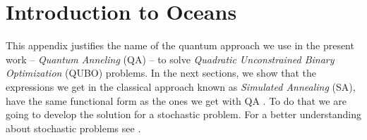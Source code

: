 
\chapter{Introduction to Oceans} %

This appendix justifies the name of the quantum approach we use in the present work -- \textit{Quantum Anneling} (QA) -- to solve \textit{Quadratic Unconstrained Binary Optimization} (QUBO) problems. In the next sections, we show that the expressions we get in the classical approach known as \textit{Simulated Annealing} (SA), have the same functional form as the ones we get with QA \cite{Kadowaki1998QuantumModel}. To do that we are going to develop the solution for a stochastic problem. For a better understanding about stochastic problems see \cite{Schneider2006StochasticOptimization}. 
\label{AppendixD} %

